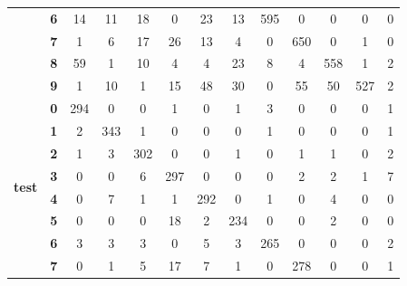 \begin{table}[htp]
{\begin{tabular}{|c|c|c|c|c|c|c|c|c|c|c|c|c|}
		& \textbf{6} & 14         & 11         & 18         & 0          & 23         & 13         & 595        & 0          & 0          & 0          & 0                \\ \cline{2-13} 
		& \textbf{7} & 1          & 6          & 17         & 26         & 13         & 4          & 0          & 650        & 0          & 1          & 0                \\ \cline{2-13} 
		& \textbf{8} & 59         & 1          & 10         & 4          & 4          & 23         & 8          & 4          & 558        & 1          & 2                \\ \cline{2-13} 
		& \textbf{9} & 1          & 10         & 1          & 15         & 48         & 30         & 0          & 55         & 50         & 527        & 2                \\ \hline
		\multirow{10}{*}{\textbf{test}}     & \textbf{0} & 294        & 0          & 0          & 1          & 0          & 1          & 3          & 0          & 0          & 0          & 1                \\ \cline{2-13} 
		& \textbf{1} & 2          & 343        & 1          & 0          & 0          & 0          & 1          & 0          & 0          & 0          & 1                \\ \cline{2-13} 
		& \textbf{2} & 1          & 3          & 302        & 0          & 0          & 1          & 0          & 1          & 1          & 0          & 2                \\ \cline{2-13} 
		& \textbf{3} & 0          & 0          & 6          & 297        & 0          & 0          & 0          & 2          & 2          & 1          & 7                \\ \cline{2-13} 
		& \textbf{4} & 0          & 7          & 1          & 1          & 292        & 0          & 1          & 0          & 4          & 0          & 0                \\ \cline{2-13} 
		& \textbf{5} & 0          & 0          & 0          & 18         & 2          & 234        & 0          & 0          & 2          & 0          & 0                \\ \cline{2-13} 
		& \textbf{6} & 3          & 3          & 3          & 0          & 5          & 3          & 265        & 0          & 0          & 0          & 2                \\ \cline{2-13} 
		& \textbf{7} & 0          & 1          & 5          & 17         & 7          & 1          & 0          & 278        & 0          & 0          & 1                \\ \cline{2-13} 

\end{tabular}}
\end{table}
